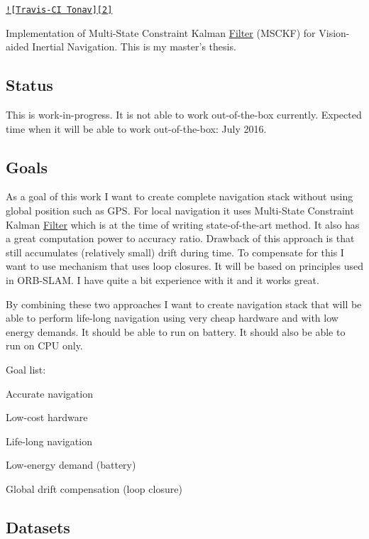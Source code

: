 \href{https://travis-ci.org/tomas789/tonav/branches}{\tt !\mbox{[}Travis-\/\-C\-I Tonav\mbox{]}\mbox{[}2\mbox{]}}

Implementation of Multi-\/\-State Constraint Kalman \hyperlink{class_filter}{Filter} (M\-S\-C\-K\-F) for Vision-\/aided Inertial Navigation. This is my master's thesis.

\subsection*{Status}

This is work-\/in-\/progress. It is not able to work out-\/of-\/the-\/box currently. Expected time when it will be able to work out-\/of-\/the-\/box\-: July 2016.

\subsection*{Goals}

As a goal of this work I want to create complete navigation stack without using global position such as G\-P\-S. For local navigation it uses Multi-\/\-State Constraint Kalman \hyperlink{class_filter}{Filter} which is at the time of writing state-\/of-\/the-\/art method. It also has a great computation power to accuracy ratio. Drawback of this approach is that still accumulates (relatively small) drift during time. To compensate for this I want to use mechanism that uses loop closures. It will be based on principles used in O\-R\-B-\/\-S\-L\-A\-M. I have quite a bit experience with it and it works great.

By combining these two approaches I want to create navigation stack that will be able to perform life-\/long navigation using very cheap hardware and with low energy demands. It should be able to run on battery. It should also be able to run on C\-P\-U only.

Goal list\-:
\begin{DoxyItemize}
\item Accurate navigation
\item Low-\/cost hardware
\item Life-\/long navigation
\item Low-\/energy demand (battery)
\item Global drift compensation (loop closure)
\end{DoxyItemize}

\subsection*{Datasets}

